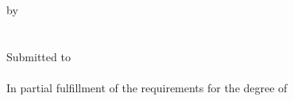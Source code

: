 \begin{center}
\vspace*{0cm}
\thispagestyle{empty}
\vspace*{-2cm}
{\Huge \bf \tbook\ \\[0.5cm]}
{\sc \Large \tsubtitlecover\ \\[0.2cm]}
\vspace*{3cm}
by\\\vspace*{.2cm}
{\Large \tauthor}\\
\vspace*{2.5cm}
{\Large \scshape \ttitlecover}\\
\vspace*{2.5cm}
{\large Submitted to}\\\vspace*{0.2cm}
{\Large \scshape \torganization}\\\vspace*{2.8cm}
{\large In partial fulfillment of the requirements for the degree of}\\\vspace*{0.5cm}
{\Large \tdegree}\\\vspace*{2.2cm}
{\large \tsubmissiondate}\\\vspace*{0.3cm}
\end{center}
\clearpage
